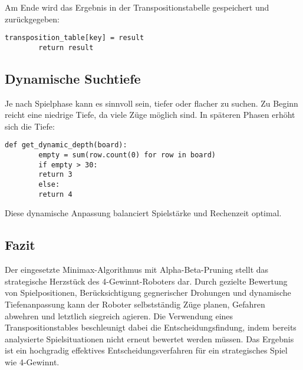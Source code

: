 	Am Ende wird das Ergebnis in der Transpositionstabelle gespeichert und zurückgegeben:
	
	\begin{lstlisting}[style=pythonstyle]
		transposition_table[key] = result
		return result
	\end{lstlisting}
	
	\subsection*{Dynamische Suchtiefe}
	
	Je nach Spielphase kann es sinnvoll sein, tiefer oder flacher zu suchen. Zu Beginn reicht eine niedrige Tiefe, da viele Züge möglich sind. In späteren Phasen erhöht sich die Tiefe:
	
	\begin{lstlisting}[style=pythonstyle]
		def get_dynamic_depth(board):
		empty = sum(row.count(0) for row in board)
		if empty > 30:
		return 3
		else:
		return 4
	\end{lstlisting}
	
	Diese dynamische Anpassung balanciert Spielstärke und Rechenzeit optimal.
	
	\subsection*{Fazit}
	
	Der eingesetzte Minimax-Algorithmus mit Alpha-Beta-Pruning stellt das strategische Herzstück des 4-Gewinnt-Roboters dar. Durch gezielte Bewertung von Spielpositionen, Berücksichtigung gegnerischer Drohungen und dynamische Tiefenanpassung kann der Roboter selbstständig Züge planen, Gefahren abwehren und letztlich siegreich agieren. Die Verwendung eines Transpositionstables beschleunigt dabei die Entscheidungsfindung, indem bereits analysierte Spielsituationen nicht erneut bewertet werden müssen. Das Ergebnis ist ein hochgradig effektives Entscheidungsverfahren für ein strategisches Spiel wie 4-Gewinnt.
	


	


